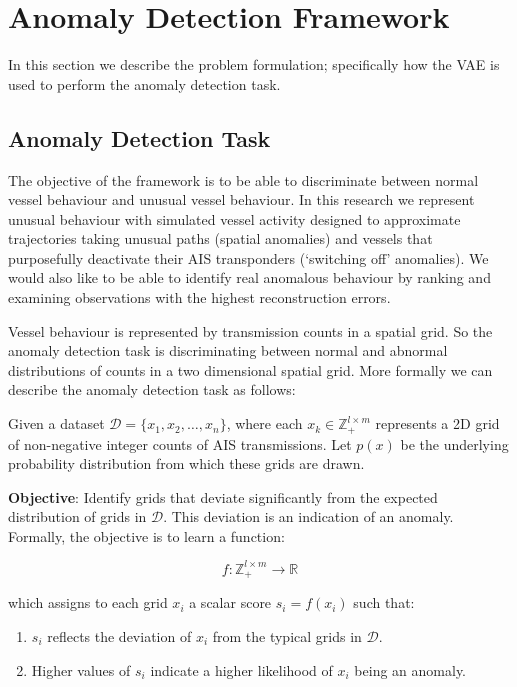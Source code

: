 \documentclass{mldsmsc}
\begin{document}
\chapter{Anomaly Detection Framework}\label{sec:anomaly_detection}

In this section we describe the problem formulation; specifically how the VAE is used to perform the anomaly detection task.

\section{Anomaly Detection Task}

The objective of the framework is to be able to discriminate between normal vessel behaviour and unusual vessel behaviour. In this research we represent unusual behaviour with simulated vessel activity designed to approximate trajectories taking unusual paths (spatial anomalies) and vessels that purposefully deactivate their AIS transponders (`switching off' anomalies). We would also like to be able to identify real anomalous behaviour by ranking and examining observations with the highest reconstruction errors.  

Vessel behaviour is represented by transmission counts in a spatial grid. So the anomaly detection task is discriminating between normal and abnormal distributions of counts in a two dimensional spatial grid. More formally we can describe the anomaly detection task as follows:

Given a dataset $\mathcal{D} = \{x_1, x_2, \dots, x_n\}$, where each $x_k \in \mathbb{Z}^{l \times m}_+$ represents a 2D grid of non-negative integer counts of AIS transmissions. Let $p(x)$ be the underlying probability distribution from which these grids are drawn.

\textbf{Objective}: Identify grids that deviate significantly from the expected distribution of grids in $\mathcal{D}$. This deviation is an indication of an anomaly. Formally, the objective is to learn a function:

\[ f: \mathbb{Z}^{l \times m}_+ \rightarrow \mathbb{R} \]

which assigns to each grid $x_i$ a scalar score $s_i = f(x_i)$ such that:

\begin{enumerate}
	\item $s_i$ reflects the deviation of $x_i$ from the typical grids in $\mathcal{D}$.
	\item Higher values of $s_i$ indicate a higher likelihood of $x_i$ being an anomaly.
\end{enumerate}
\end{document}
